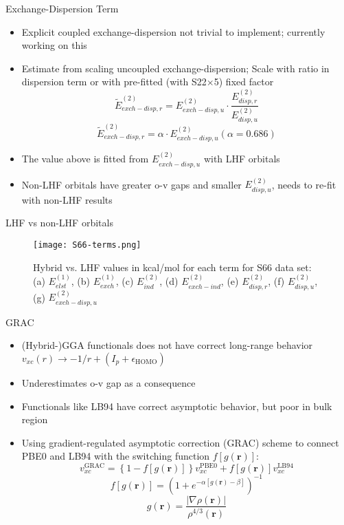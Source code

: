 \documentclass{beamer}
\begin{document}
        \begin{frame}{Exchange-Dispersion Term}
            \begin{itemize}
                \item Explicit coupled exchange-dispersion not trivial to implement; currently working on this
                \item Estimate from scaling uncoupled exchange-dispersion; Scale with ratio in dispersion term or with pre-fitted (with S22$\times$5) fixed factor 
                $$\tilde{E}^{(2)}_{exch-disp,r} = E^{(2)}_{exch-disp,u} \cdot \frac{E^{(2)}_{disp,r}}{E^{(2)}_{disp,u}}$$
                $$\tilde{E}^{(2)}_{exch-disp,r} = \alpha \cdot E^{(2)}_{exch-disp,u} (\alpha = 0.686)$$
                \item The value above is fitted from $E_{exch-disp,u}^{(2)}$ with LHF orbitals
                \item Non-LHF orbitals have greater o-v gaps and smaller $E_{disp,u}^{(2)}$, needs to re-fit with non-LHF results
            \end{itemize}
        \end{frame}

        \begin{frame}{LHF vs non-LHF orbitals}
            \begin{figure}
            \centering
            \texttt{[image: S66-terms.png]}
            \caption{Hybrid vs. LHF values in kcal/mol for each term for S66 data set: (a) $E_{elst}^{(1)}$, (b) $E_{exch}^{(1)}$, (c) $E_{ind}^{(2)}$, (d) $E_{exch-ind}^{(2)}$, (e) $E_{disp,r}^{(2)}$, (f) $E_{disp,u}^{(2)}$, (g) $E_{exch-disp,u}^{(2)}$} 
            \end{figure}        
        \end{frame}

        \begin{frame}{GRAC}
            \begin{itemize}
                \item (Hybrid-)GGA functionals does not have correct long-range behavior $v_{xc}(r) \rightarrow -1/r + (I_p + \epsilon_{\text{HOMO}})$
                \item Underestimates o-v gap as a consequence
                \item Functionals like LB94 have correct asymptotic behavior, but poor in bulk region
                \item Using gradient-regulated asymptotic correction (GRAC) scheme to connect PBE0 and LB94 with the switching function $f[g(\boldsymbol{r})]$:
                $$v_{xc}^{\text{GRAC}} = \left\{1-f[g(\boldsymbol{r})]\right\}v_{xc}^{\text{PBE0}} + f[g(\boldsymbol{r})] v_{xc}^{\text{LB94}}$$
                $$f[g(\boldsymbol{r})] = \left( 1+e^{-\alpha [g(\boldsymbol{r}) - \beta]} \right)^{-1}$$
                $$g(\boldsymbol{r}) = \frac{\left| \nabla \rho (\boldsymbol{r}) \right|}{\rho^{4/3}(\boldsymbol{r})}$$
            \end{itemize}
        \end{frame}        
        
\end{document}
